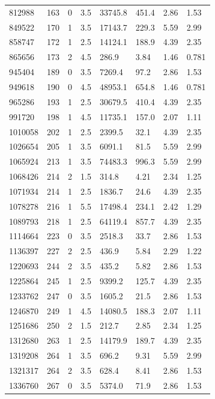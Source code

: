 \documentclass[preview]{standalone}
\begin{document}
{{{\begin{tabular}{L{1.2cm}C{1.2cm} C{0.3cm}C{0.5cm} C{1.4cm}C{1.4cm} C{1.4cm}C{1.4cm}}
  812988  &   163  & 0     & 3.5 &  33745.8  & 451.4  & 2.86 &  1.53   \\ 
  849522  &   170  & 1     & 3.5 &  17143.7  & 229.3  & 5.59 &  2.99   \\ 
  858747  &   172  & 1     & 2.5 &  14124.1  & 188.9  & 4.39 &  2.35   \\ 
  865656  &   173  & 2     & 4.5 &  286.9  & 3.84  & 1.46 &  0.781   \\ 
  945404  &   189  & 0     & 3.5 &  7269.4  & 97.2  & 2.86 &  1.53   \\ 
  949618  &   190  & 0     & 4.5 &  48953.1  & 654.8  & 1.46 &  0.781   \\ 
  965286  &   193  & 1     & 2.5 &  30679.5  & 410.4  & 4.39 &  2.35   \\ 
  991720  &   198  & 1     & 4.5 &  11735.1  & 157.0  & 2.07 &  1.11   \\ 
  1010058  &   202  & 1     & 2.5 &  2399.5  & 32.1  & 4.39 &  2.35   \\ 
  1026654  &   205  & 1     & 3.5 &  6091.1  & 81.5  & 5.59 &  2.99   \\ 
  1065924  &   213  & 1     & 3.5 &  74483.3  & 996.3  & 5.59 &  2.99   \\ 
  1068426  &   214  & 2     & 1.5 &  314.8  & 4.21  & 2.34 &  1.25   \\ 
  1071934  &   214  & 1     & 2.5 &  1836.7  & 24.6  & 4.39 &  2.35   \\ 
  1078278  &   216  & 1     & 5.5 &  17498.4  & 234.1  & 2.42 &  1.29   \\ 
  1089793  &   218  & 1     & 2.5 &  64119.4  & 857.7  & 4.39 &  2.35   \\ 
  1114664  &   223  & 0     & 3.5 &  2518.3  & 33.7  & 2.86 &  1.53   \\ 
  1136397  &   227  & 2     & 2.5 &  436.9  & 5.84  & 2.29 &  1.22   \\ 
  1220693  &   244  & 2     & 3.5 &  435.2  & 5.82  & 2.86 &  1.53   \\ 
  1225864  &   245  & 1     & 2.5 &  9399.2  & 125.7  & 4.39 &  2.35   \\ 
  1233762  &   247  & 0     & 3.5 &  1605.2  & 21.5  & 2.86 &  1.53   \\ 
  1246870  &   249  & 1     & 4.5 &  14080.5  & 188.3  & 2.07 &  1.11   \\ 
  1251686  &   250  & 2     & 1.5 &  212.7  & 2.85  & 2.34 &  1.25   \\ 
  1312680  &   263  & 1     & 2.5 &  14179.9  & 189.7  & 4.39 &  2.35   \\ 
  1319208  &   264  & 1     & 3.5 &  696.2  & 9.31  & 5.59 &  2.99   \\ 
  1321317  &   264  & 2     & 3.5 &  628.4  & 8.41  & 2.86 &  1.53   \\ 
  1336760  &   267  & 0     & 3.5 &  5374.0  & 71.9  & 2.86 &  1.53   \\ 
\hline 
\end{tabular} 

}}}
\end{document}
